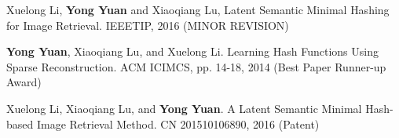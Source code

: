 

\begin{cventries}
\vspace{-0.8em}
  \cventry
    {} %
    {} %
    {} %
    {} %
    {
      \begin{cvitems} %
        \item {Xuelong Li, \textbf{Yong Yuan} and Xiaoqiang Lu, Latent Semantic Minimal Hashing for Image Retrieval. IEEETIP, 2016 (MINOR REVISION)}
        \item {\textbf{Yong Yuan}, Xiaoqiang Lu, and Xuelong Li. Learning Hash Functions Using Sparse Reconstruction. ACM ICIMCS, pp. 14-18, 2014 (Best Paper Runner-up Award)}
        \item {Xuelong Li, Xiaoqiang Lu, and \textbf{Yong Yuan}. A Latent Semantic Minimal Hash-based Image Retrieval Method. CN 201510106890, 2016 (Patent)}
      \end{cvitems}
    }


\end{cventries}
